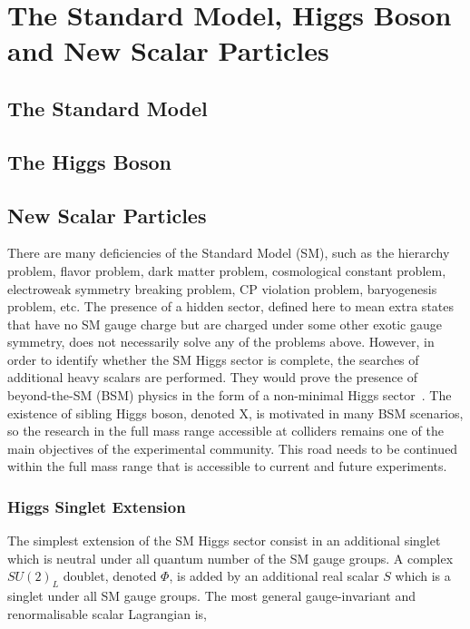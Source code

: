 \chapter{The Standard Model, Higgs Boson and New Scalar Particles }

\section{The Standard Model}

\section{The Higgs Boson}

\section{New Scalar Particles}

There are many deficiencies of the Standard Model (SM), such as the hierarchy problem,
flavor problem, dark matter problem, cosmological constant problem, electroweak symmetry breaking problem, CP violation problem, baryogenesis problem, etc.
The presence of a hidden sector, defined here to mean extra states that
have no SM gauge charge but are charged under some other exotic gauge symmetry, does not necessarily solve any of the problems above. However, in order to identify whether the SM Higgs sector is complete,  the searches of additional heavy scalars are performed.  They would prove the presence of beyond-the-SM (BSM) physics in the form of a non-minimal Higgs sector~\cite{Robens:2015gla}. The existence of sibling Higgs boson, denoted X, is motivated in many BSM scenarios, so the research in the full mass range accessible at colliders  remains one of the main objectives of the experimental community. This  road  needs  to  be continued within the full mass range that is accessible to current and future experiments.
\newline
\subsection*{Higgs Singlet Extension}
The simplest extension of the SM Higgs sector consist in an additional singlet which is neutral under all quantum number of the SM gauge groups.
A complex $SU(2)_L$ doublet,  denoted $\Phi$, is added by an additional real scalar $S$ which is a singlet under all SM gauge groups. 
The most general gauge-invariant and renormalisable scalar Lagrangian is,


